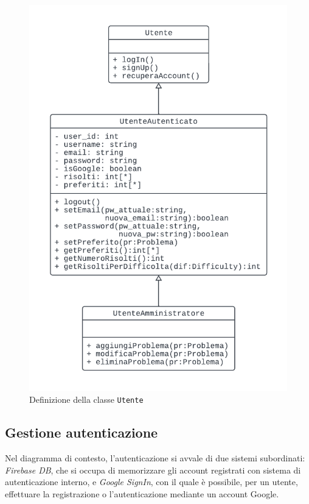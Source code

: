 \documentclass[11pt, a4paper]{article}
\theoremstyle{definition} %
\begin{document}
\begin{figure}[H]
\centering
\includegraphics[scale = 0.7]{materiale/class-utenti.pdf}
\caption{Definizione della classe \texttt{Utente}}
\label{utenti}
\end{figure}







\newpage
\subsection{Gestione autenticazione}
Nel diagramma di contesto, l'autenticazione si avvale di due sistemi
subordinati: \textit{Firebase DB}, che si occupa di memorizzare gli account
registrati con sistema di autenticazione interno, e \textit{Google SignIn},
con il quale è possibile, per un utente, effettuare la registrazione o
l'autenticazione mediante un account Google.
\end{document}
